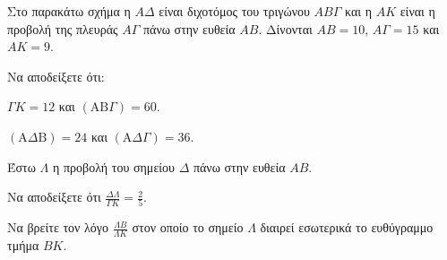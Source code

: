 Στο παρακάτω σχήμα η $A\Delta$ είναι διχοτόμος του τριγώνου $AB\Gamma$ και η $AK$ είναι η προβολή της πλευράς $A\Gamma$ πάνω στην ευθεία $AB$. Δίνονται $AB = 10$, $A\Gamma = 15$ και $AK = 9$.
\begin{alist}
    \item Να αποδείξετε ότι:
    \begin{rlist}
        \item $\Gamma K = 12$ και $(\text{AB}\Gamma) = 60$. 
        \item $(\text{A}\Delta\text{B}) = 24$ και $(\text{A}\Delta\Gamma) = 36$. 
    \end{rlist}
    \item Έστω $\Lambda$ η προβολή του σημείου $\Delta$ πάνω στην ευθεία $AB$.
    \begin{rlist}
        \item Να αποδείξετε ότι $\displaystyle \frac{\Delta\Lambda}{\Gamma K} = \frac{2}{5}$. 
        \item Να βρείτε τον λόγο $\displaystyle \frac{\Lambda B}{\Lambda K}$ στον οποίο το σημείο $\Lambda$ διαιρεί εσωτερικά το ευθύγραμμο τμήμα $BK$. 
    \end{rlist}
\end{alist}